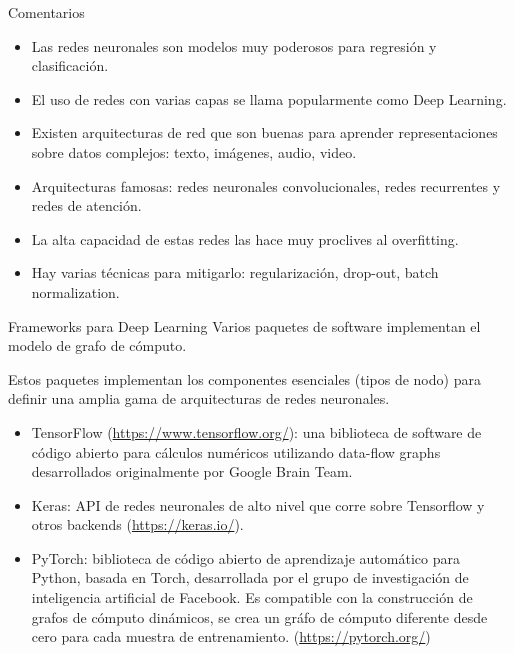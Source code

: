 \documentclass[handout]{beamer}
\begin{document}
\begin{frame}{Comentarios}
\begin{scriptsize}
\begin{itemize}
\item Las redes neuronales son modelos muy poderosos para regresión y clasificación. 

\item El uso de redes con varias capas se llama popularmente como Deep Learning.

\item Existen arquitecturas de red que son buenas para aprender representaciones sobre datos complejos: texto, imágenes, audio, video.

\item Arquitecturas famosas: redes neuronales convolucionales, redes recurrentes y redes de atención.

\item La alta capacidad de estas redes las hace muy proclives al overfitting.

\item Hay varias técnicas para mitigarlo: regularización, drop-out, batch normalization.


\end{itemize}
\end{scriptsize}
\end{frame}


\begin{frame}{Frameworks para Deep Learning}
Varios paquetes de software implementan el modelo de grafo de cómputo. 

Estos paquetes implementan los componentes esenciales (tipos de nodo) para definir una amplia gama de arquitecturas de redes neuronales.
\begin{scriptsize}
\begin{itemize}
\item TensorFlow (\url{https://www.tensorflow.org/}): una biblioteca de software de código abierto para cálculos numéricos utilizando data-flow graphs desarrollados originalmente por Google Brain Team.

\item Keras: API de redes neuronales de alto nivel que corre sobre Tensorflow y otros  backends (\url{https://keras.io/}). 

\item PyTorch:  biblioteca de código abierto de aprendizaje automático para Python, basada en Torch, desarrollada por el grupo de investigación de inteligencia artificial de Facebook. Es compatible con la construcción de grafos de cómputo dinámicos, se crea un gráfo de cómputo diferente desde cero para cada muestra de entrenamiento.  (\url{https://pytorch.org/})
\end{itemize}
\end{scriptsize}
\end{frame}
\end{document}
